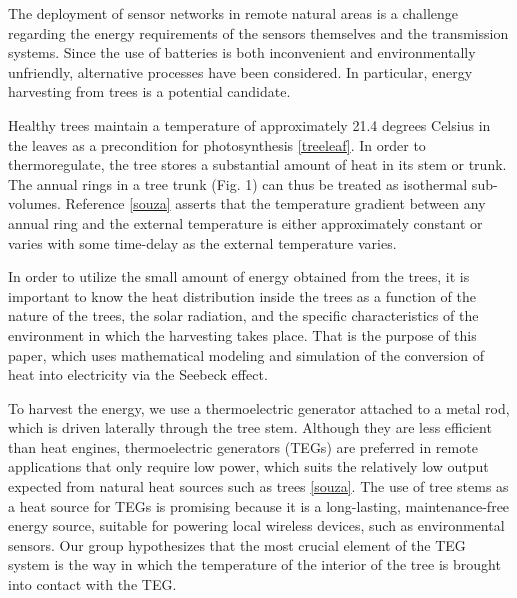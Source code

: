 \documentclass{IEEEtran} %
\begin{document}

The deployment of sensor networks in remote natural areas is a challenge regarding the energy requirements of the sensors themselves and the transmission systems. Since the use of batteries is both inconvenient and environmentally unfriendly, alternative processes have been considered. In particular, energy harvesting from trees is a potential candidate.

Healthy trees maintain a temperature of approximately 21.4 degrees Celsius in the leaves as a precondition for photosynthesis \ref{treeleaf}. In order to thermoregulate, the tree stores a substantial amount of heat in its stem or trunk. The annual rings in a tree trunk (Fig. 1) can thus be treated as isothermal sub-volumes. Reference \ref{souza} asserts that the temperature gradient between any annual ring and the external temperature is either approximately constant or varies with some time-delay as the external temperature varies. 

In order to utilize the small amount of energy obtained from the trees, it is important to know the heat distribution inside the trees as a function of the nature of the trees, the solar radiation, and the specific characteristics of the environment in which the harvesting takes place. That is the purpose of this paper, which uses mathematical modeling and simulation of the conversion of heat into electricity via the Seebeck effect. 


To harvest the energy, we use a thermoelectric generator attached to a metal rod, which is driven laterally through the tree stem. Although they are less efficient than heat engines, thermoelectric generators (TEGs) are preferred in remote applications that only require low power, which suits the relatively low output expected from natural heat sources such as trees \ref{souza}. The use of tree stems as a heat source for TEGs is promising because it is a long-lasting, maintenance-free energy source, suitable for powering local wireless devices, such as environmental sensors. Our group hypothesizes that the most crucial element of the TEG system is the way in which the temperature of the interior of the tree is brought into contact with the TEG.
\end{document}
